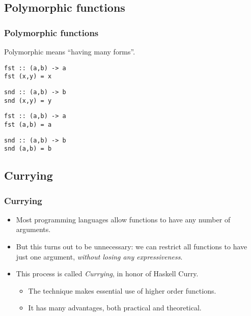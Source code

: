 \documentclass{beamer}
\begin{document}
\subsection{Polymorphic functions}
\begin{frame}[fragile]
\frametitle{Polymorphic functions}

Polymorphic means ``having many forms''.

\begin{verbatim}
fst :: (a,b) -> a
fst (x,y) = x
\end{verbatim}

\begin{verbatim}
snd :: (a,b) -> b
snd (x,y) = y
\end{verbatim}

\begin{verbatim}
fst :: (a,b) -> a
fst (a,b) = a
\end{verbatim}

\begin{verbatim}
snd :: (a,b) -> b
snd (a,b) = b
\end{verbatim}

\end{frame}

\subsection{Currying}
\begin{frame}[fragile]
\frametitle{Currying}

\begin{itemize}
\item Most programming languages allow functions to have any number
  of arguments.
\item But this turns out to be unnecessary: we can restrict all
  functions to have just one argument, \emph{without losing any
    expressiveness}.
\item This process is called \emph{Currying}, in honor of Haskell
  Curry.
  \begin{itemize}
  \item The technique makes essential use of higher order
    functions.
  \item It has many advantages, both practical and theoretical.
  \end{itemize}
\end{itemize}

\end{frame}
\end{document}
